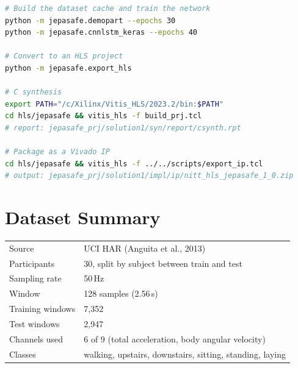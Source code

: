 \documentclass[11pt,a4paper]{article}
\begin{document}
\begin{lstlisting}[language=bash]
# Build the dataset cache and train the network
python -m jepasafe.demopart --epochs 30
python -m jepasafe.cnnlstm_keras --epochs 40

# Convert to an HLS project
python -m jepasafe.export_hls

# C synthesis
export PATH="/c/Xilinx/Vitis_HLS/2023.2/bin:$PATH"
cd hls/jepasafe && vitis_hls -f build_prj.tcl
# report: jepasafe_prj/solution1/syn/report/csynth.rpt

# Package as a Vivado IP
cd hls/jepasafe && vitis_hls -f ../../scripts/export_ip.tcl
# output: jepasafe_prj/solution1/impl/ip/nitt_hls_jepasafe_1_0.zip
\end{lstlisting}

\section{Dataset Summary}

\begin{table}[h]
\centering
\begin{tabular}{ll}
\toprule
Source           & UCI HAR (Anguita et al., 2013) \\
Participants     & 30, split by subject between train and test \\
Sampling rate    & 50\,Hz \\
Window           & 128 samples (2.56\,s) \\
Training windows & 7{,}352 \\
Test windows     & 2{,}947 \\
Channels used    & 6 of 9 (total acceleration, body angular velocity) \\
Classes          & walking, upstairs, downstairs, sitting, standing, laying \\
\bottomrule
\end{tabular}
\end{table}
\end{document}
